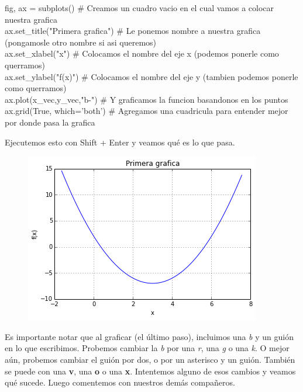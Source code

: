 \documentclass[10pt,letterpaper]{article}
\newenvironment{Code}
{
\begin{lrbox}{\selvestebox}%
\begin{minipage}{\dimexpr\columnwidth-2\fboxsep\relax}
\fontfamily{\ttdefault}\selectfont
}
{\end{minipage}\end{lrbox}%
\begin{center}
\colorbox{light-gray}{\usebox{\selvestebox}}
\end{center}
}
\begin{document}
\begin{footnotesize}
\begin{Code}
fig, ax = subplots() \# Creamos un cuadro vacio en el cual vamos a colocar nuestra grafica\\
ax.set\_title("Primera grafica") \# Le ponemos nombre a nuestra grafica (pongamosle otro nombre si asi queremos)\\
ax.set\_xlabel("x") \# Colocamos el nombre del eje x (podemos ponerle como querramos)\\
ax.set\_ylabel("f(x)") \# Colocamos el nombre del eje y (tambien podemos ponerle como querramos)\\
ax.plot(x\_vec,y\_vec,"b-") \# Y graficamos la funcion basandonos en los puntos\\
ax.grid(True, which='both') \# Agregamos una cuadricula para entender mejor por donde pasa la grafica
\end{Code}
\end{footnotesize}

\noindent Ejecutemos esto con Shift + Enter y veamos qu\'e es lo que pasa.

\begin{figure}[H]
\begin{center}
\includegraphics[scale=0.5]{img/graf1.png}
\end{center}
\end{figure}

\vspace*{-6mm}

\noindent Es importante notar que al graficar (el \'ultimo paso), incluimos una \emph{b} y un gui\'on en lo que escribimos. Probemos cambiar la \emph{b} por una \emph{r}, una \emph{g} o una \emph{k}. O mejor a\'un, probemos cambiar el gui\'on por dos, o por un asterisco y un gui\'on. Tambi\'en se puede con una \textbf{v}, una \textbf{o} o una \textbf{x}. Intentemos alguno de esos cambios y veamos qu\'e sucede. Luego comentemos con nuestros dem\'as compa\~neros.\\
\end{document}
